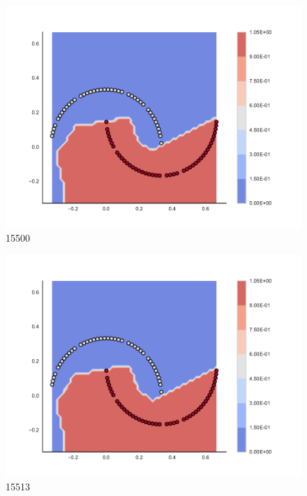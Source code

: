 \begin{subfigure}[b]{0.09\textwidth}
    \includegraphics[clip, trim=2.35cm 1.75cm 4.5cm 0cm,width=\textwidth]{img/convergence/15500.pdf}
    \caption{15500}
    \label{fig:convergence_15500}
\end{subfigure}
%
\begin{subfigure}[b]{0.09\textwidth}
    \includegraphics[clip, trim=2.35cm 1.75cm 4.5cm 0cm,width=\textwidth]{img/convergence/15513.pdf}
    \caption{15513}
    \label{fig:convergence_15513}
\end{subfigure}
%
